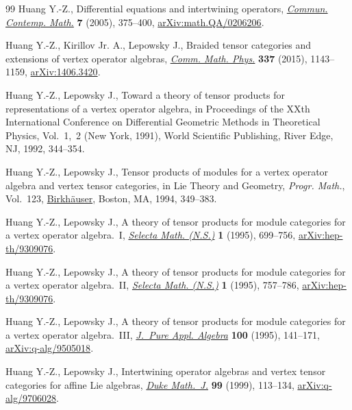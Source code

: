 \documentclass[pdftex]{sigma}
\numberwithin{equation}{section}
\begin{document}
\begin{thebibliography}{99}
Huang Y.-Z., Differential equations and intertwining operators,
 \href{https://doi.org/10.1142/S0219199705001799}{\textit{Commun. Contemp.
 Math.}} \textbf{7} (2005), 375--400,
 \href{http://arxiv.org/abs/math.QA/0206206}{arXiv:math.QA/0206206}.

Huang Y.-Z., Kirillov Jr. A., Lepowsky J., Braided tensor categories and
 extensions of vertex operator algebras,
 \href{https://doi.org/10.1007/s00220-015-2292-1}{\textit{Comm. Math. Phys.}}
 \textbf{337} (2015), 1143--1159,
 \href{http://arxiv.org/abs/1406.3420}{arXiv:1406.3420}.

Huang Y.-Z., Lepowsky J., Toward a theory of tensor products for representations
 of a vertex operator algebra, in Proceedings of the {XX}th {I}nternational
 {C}onference on {D}ifferential {G}eometric {M}ethods in {T}heoretical
 {P}hysics, {V}ol.~1,~2 ({N}ew {Y}ork, 1991), World Scientific Publishing,
 River Edge, NJ, 1992, 344--354.

Huang Y.-Z., Lepowsky J., Tensor products of modules for a vertex operator
 algebra and vertex tensor categories, in Lie {T}heory and {G}eometry,
 \textit{Progr. Math.}, Vol.~123,
 \href{https://doi.org/10.1007/978-1-4612-0261-5_13}{Birkh\"auser}, Boston,
 MA, 1994, 349--383.

Huang Y.-Z., Lepowsky J., A theory of tensor products for module categories for
 a vertex operator algebra.~{I},
 \href{https://doi.org/10.1007/BF01587908}{\textit{Selecta Math. (N.S.)}}
 \textbf{1} (1995), 699--756,
 \href{http://arxiv.org/abs/hep-th/9309076}{arXiv:hep-th/9309076}.

Huang Y.-Z., Lepowsky J., A theory of tensor products for module categories for
 a vertex operator algebra.~{II},
 \href{https://doi.org/10.1007/BF01587908}{\textit{Selecta Math. (N.S.)}}
 \textbf{1} (1995), 757--786,
 \href{http://arxiv.org/abs/hep-th/9309076}{arXiv:hep-th/9309076}.

Huang Y.-Z., Lepowsky J., A theory of tensor products for module categories for
 a vertex operator algebra.~{III},
 \href{https://doi.org/10.1016/0022-4049(95)00049-3}{\textit{J.~Pure Appl.
 Algebra}} \textbf{100} (1995), 141--171,
 \href{http://arxiv.org/abs/q-alg/9505018}{arXiv:q-alg/9505018}.

Huang Y.-Z., Lepowsky J., Intertwining operator algebras and vertex tensor
 categories for affine {L}ie algebras,
 \href{https://doi.org/10.1215/S0012-7094-99-09905-2}{\textit{Duke Math.~J.}}
 \textbf{99} (1999), 113--134,
 \href{http://arxiv.org/abs/q-alg/9706028}{arXiv:q-alg/9706028}.


\end{thebibliography}
\end{document}
